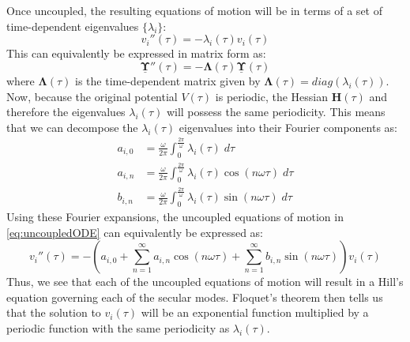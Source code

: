 \documentclass{article}
\begin{document}
 \par
\medskip
\noindent Once uncoupled, the resulting equations of motion will be in terms of a set of time-dependent eigenvalues $\{ \lambda_i \}$:
\begin{equation}
v_i '' (\tau) = - \lambda_i (\tau) v_i (\tau)	
\label{eq:uncoupledODE}
\end{equation}
This can equivalently be expressed in matrix form as:
\begin{equation}
	\underline{\boldsymbol{\Upsilon}}'' (\tau) = - \boldsymbol{\Lambda} (\tau) \underline{\boldsymbol{\Upsilon}} (\tau)
\end{equation}
where $\boldsymbol{\Lambda} (\tau)$ is the time-dependent matrix given by $\boldsymbol{\Lambda} (\tau) = diag(\lambda_i (\tau))$. Now, because the original potential $V (\tau)$ is periodic, the Hessian $\textbf{H} (\tau)$ and therefore the eigenvalues $\lambda_i (\tau)$ will possess the same periodicity. This means that we can decompose the $\lambda_i (\tau)$ eigenvalues into their Fourier components as:
\begin{align}
a_{i, 0} & = \frac{\omega}{2 \pi} \int_0^{\frac{2 \pi}{\omega}} \lambda_i (\tau) \; d \tau \label{eq:firstcomp} \\
a_{i, n} & = \frac{\omega}{2 \pi} \int_0^{\frac{2 \pi}{\omega}} \lambda_i (\tau) \cos (n \omega \tau) \; d \tau \label{eq:secondcomp} \\
b_{i, n} & = \frac{\omega}{2 \pi} \int_0^{\frac{2 \pi}{\omega}} \lambda_i (\tau) \sin (n \omega \tau) \; d \tau
\end{align}
Using these Fourier expansions, the uncoupled equations of motion in \eqref{eq:uncoupledODE} can equivalently be expressed as:
\begin{equation}
v_i '' (\tau) = - \left( a_{i, 0} + \sum_{n = 1}^{\infty} a_{i, n} \cos (n \omega \tau) + \sum_{n = 1}^{\infty} b_{i, n} \sin (n \omega \tau) \right)	v_i (\tau)
\label{eq:uncoupledEOM}
\end{equation}
Thus, we see that each of the uncoupled equations of motion will result in a Hill's equation governing each of the secular modes. Floquet's theorem then tells us that the solution to $v_i (\tau)$ will be an exponential function multiplied by a periodic function with the same periodicity as $\lambda_i (\tau)$. \par
\medskip
\end{document}
